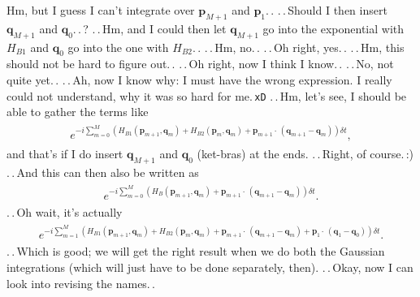 \documentclass{report}
\begin{document}
Hm, but I guess I can't integrate over $\boldsymbol{p}_{M+1}$ and $\boldsymbol{p}_1$.\,. .\,.\,Should I then insert $\boldsymbol{q}_{M+1}$ and $\boldsymbol{q}_0$.\,.\,? .\,.\,Hm, and I could then let $\boldsymbol{q}_{M+1}$ go into the exponential with $H_{B1}$ and $\boldsymbol{q}_{0}$ go into the one with $H_{B2}$.\,. .\,.\,Hm, no.\,. .\,.\,Oh right, yes.\,. .\,.\,Hm, this should not be hard to figure out.\,. .\,.\,Oh right, now I think I know.\,. .\,.\,No, not quite yet.\,. .\,.\,Ah, now I know why: I must have the wrong expression. I really could not understand, why it was so hard for me.\,\texttt{xD} .\,.\,Hm, let's see, I should be able to gather the terms like
\begin{align}
\begin{aligned}
		e^{-i  
			\sum_{m=0}^{M} (
				H_{B1}(\boldsymbol{p}_{m+1}, \boldsymbol{q}_{m}) + 
				H_{B2}(\boldsymbol{p}_{m}, \boldsymbol{q}_{m}) +
				\boldsymbol{p}_{m+1} \cdot\, (\boldsymbol{q}_{m+1} - \boldsymbol{q}_{m})
			) \delta t
		},
\end{aligned}
\end{align} 
and that's if I do insert $\boldsymbol{q}_{M+1}$ and $\boldsymbol{q}_0$ (ket-bras) at the ends. .\,.\,Right, of course.\,:) .\,.\,And this can then also be written as 
\begin{align}
\begin{aligned}
		e^{-i  
			\sum_{m=0}^{M} (
				H_{B}(\boldsymbol{p}_{m+1}, \boldsymbol{q}_{m}) + 
				\boldsymbol{p}_{m+1} \cdot\, (\boldsymbol{q}_{m+1} - \boldsymbol{q}_{m})
			) \delta t
		}.
\end{aligned}
\end{align} 
.\,.\,Oh wait, it's actually
\begin{align}
\begin{aligned}
		e^{-i  
			\sum_{m=1}^{M} (
				H_{B1}(\boldsymbol{p}_{m+1}, \boldsymbol{q}_{m}) + 
				H_{B2}(\boldsymbol{p}_{m}, \boldsymbol{q}_{m}) +
				\boldsymbol{p}_{m+1} \cdot\, (\boldsymbol{q}_{m+1} - \boldsymbol{q}_{m}) +
				\boldsymbol{p}_{1} \cdot\, (\boldsymbol{q}_{1} - \boldsymbol{q}_{0})
			) \delta t
		}.
\end{aligned}
\end{align}
.\,.\,Which is good; we will get the right result when we do both the Gaussian integrations (which will just have to be done separately, then). .\,.\,Okay, now I can look into revising the names.\,. %
\end{document}
